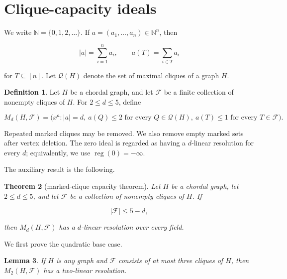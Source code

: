 \documentclass[11pt]{article}
\newtheorem{theorem}{Theorem}[section]
\newtheorem{lemma}[theorem]{Lemma}
\theoremstyle{definition}
\newtheorem{definition}[theorem]{Definition}
\theoremstyle{remark}
\numberwithin{equation}{section}
\begin{document}
\section{Clique-capacity ideals}


We write $\mathbb N=\{0,1,2,\ldots\}$. If
$a=(a_1,\ldots,a_n)\in\mathbb N^n$, then

\nopagebreak[4]
\[
|a|=\sum_{i=1}^n a_i,
\qquad
a(T)=\sum_{i\in T}a_i
\]

for $T\subseteq[n]$. Let $\mathcal Q(H)$ denote the set of maximal cliques of
a graph $H$.

\Needspace{0.25\textheight}
\begin{definition}

Let $H$ be a chordal graph, and let $\mathcal F$ be a finite collection of
nonempty cliques of $H$. For $2\leq d\leq5$, define

\nopagebreak[4]
\[
M_d(H,\mathcal F)
=
\bigl(x^a:
|a|=d,
\ a(Q)\leq2\text{ for every }Q\in\mathcal Q(H),
\ a(T)\leq1\text{ for every }T\in\mathcal F
\bigr).
\tag{2.1}
\]

Repeated marked cliques may be removed. We also remove empty marked sets after
vertex deletion. The zero ideal is regarded as having a $d$-linear resolution
for every $d$; equivalently, we use $\operatorname{reg}(0)=-\infty$.

\end{definition}


The auxiliary result is the following.

\Needspace{0.25\textheight}
\begin{theorem}[marked-clique capacity theorem]

Let $H$ be a chordal graph, let $2\leq d\leq5$, and let $\mathcal F$ be a
collection of nonempty cliques of $H$. If

\nopagebreak[4]
\[
|\mathcal F|\leq5-d,
\tag{2.2}
\]

then $M_d(H,\mathcal F)$ has a $d$-linear resolution over every field.

\end{theorem}


We first prove the quadratic base case.

\Needspace{0.25\textheight}
\begin{lemma}

If $H$ is any graph and $\mathcal F$ consists of at most three cliques of
$H$, then $M_2(H,\mathcal F)$ has a two-linear resolution.

\end{lemma}
\end{document}
